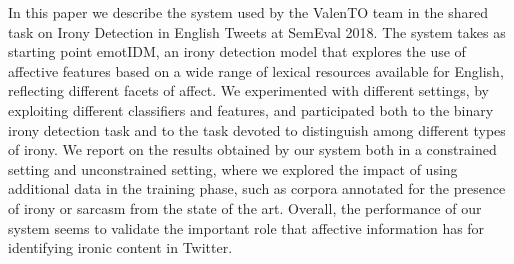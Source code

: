 In this paper we describe the system used by the ValenTO team in the shared task on Irony Detection in English Tweets at SemEval 2018. The system takes as starting point emotIDM, an irony detection model that explores the use of affective features based on a wide range of lexical resources available for English, reflecting different facets of affect. We experimented with different settings, by exploiting different classifiers and features, and participated both to the binary irony detection task and to the task devoted to distinguish among different types of irony. We report on the results obtained by our system both in a constrained setting and unconstrained setting, where we explored the impact of using additional data in the training phase, such as corpora annotated for the presence of irony or sarcasm from the state of the art. Overall, the performance of our system seems to validate the important role that affective information has for identifying ironic content in Twitter.
